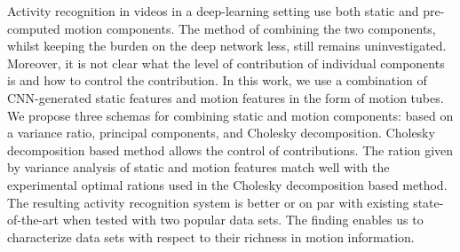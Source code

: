 Activity recognition in videos in a deep-learning setting use both static and pre-computed motion components. The method of combining the two components, whilst keeping the burden on the deep network less, still remains uninvestigated. Moreover, it is not clear what the level of contribution of individual components is and how to control the contribution. In this work, we use a combination of CNN-generated static features and motion features in the form of motion tubes. We propose three schemas for combining static and motion components: based on a variance ratio, principal components, and Cholesky decomposition. Cholesky decomposition based method allows the control of contributions. The ration given by variance analysis of static and motion features match well with the experimental optimal rations used in the Cholesky decomposition based method. The resulting activity recognition system is better or on par with existing state-of-the-art when tested with two popular data sets. The finding enables us to characterize data sets with respect to their richness in motion information. 